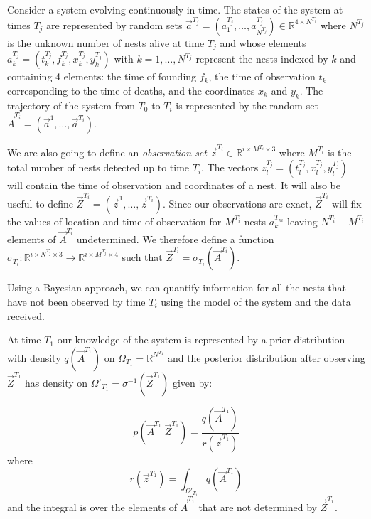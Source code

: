 {Consider a system evolving continuously in time. The states of the system at times $T_j$ are represented by random sets $\vec{a}^{T_j} = (a^{T_j}_1, \dots, a^{T_j}_{N^{T_j}}) \in \mathbb{R}^{4\times N^{T_j}}$ where $N^{T_j}$ is the unknown number of nests alive at time $T_j$ and whose elements $a^{T_j}_k = (t_k^{T_j}, f_k^{T_j}, x_k^{T_j}, y_k^{T_j})$ with $k = 1, \dots , N^{T_j}$ represent the nests indexed by $k$ and containing 4 elements: the time of founding $f_k$, the time of observation $t_k$ corresponding to the time of deaths, and the coordinates $x_k$ and $y_k$.
The trajectory of the system from $T_0$ to $T_i$ is represented by the random set $\vec{A}^{T_i} = (\vec{a}^1, \dots, \vec{a}^{T_i})$. 

We are also going to define an \textit{observation set} $\vec{z}^{T_i} \in \mathbb{R}^{i \times M^{T_i} \times 3}$ where $M^{T_i}$ is the total number of nests detected up to time $T_i$. The vectors $z^{T_j}_l = (t^{T_j}_l, x^{T_j}_l, y^{T_j}_l)$ will contain the time of observation and coordinates of a nest. It will also be useful to define $\vec{Z}^{T_i} = (\vec{z}^1, \dots, \vec{z}^{T_i})$. Since our observations are exact, $\vec{Z}^{T_i}$ will fix the values of location and time of observation for $M^{T_i}$ nests $a^{T_m}_k$ leaving $N^{T_i}-M^{T_i}$ elements of $\vec{A}^{T_i}$ undetermined. We therefore define a function $\sigma_{T_i}: \mathbb{R}^{i\times N^{T_j}\times 3} \rightarrow \mathbb{R}^{i\times M^{T_j}\times 4}$ such that $\vec{Z}^{T_i} = \sigma_{T_i}(\vec{A}^{T_i})$.

Using a Bayesian approach, we can quantify information for all the nests that have not been observed by time $T_i$ using the model of the system and the data received.

At time $T_1$ our knowledge of the system is represented by a prior distribution with density $q(\vec{A}^{T_1})$ on $\Omega_{T_1} = \mathbb{R}^{N^{T_1}}$ and the posterior distribution after observing $\vec{Z}^{T_1}$ has density on $\Omega'_{T_1} = \sigma^{-1}(\vec{Z}^{T_1})$ given by:

\begin{equation*}
    p(\vec{A}^{T_1} | \vec{Z}^{T_1}) = \frac{q(\vec{A}^{T_1})}{r(\vec{z}^{T_1})}
\end{equation*}
where
\begin{equation*}
    r(\vec{z}^{T_1}) = \int_{\Omega'_{T_1}} q(\vec{A}^{T_1}) 
\end{equation*}
and the integral is over the elements of $\vec{A}^{T_1}$ that are not determined by $\vec{Z}^{T_1}$.

}
